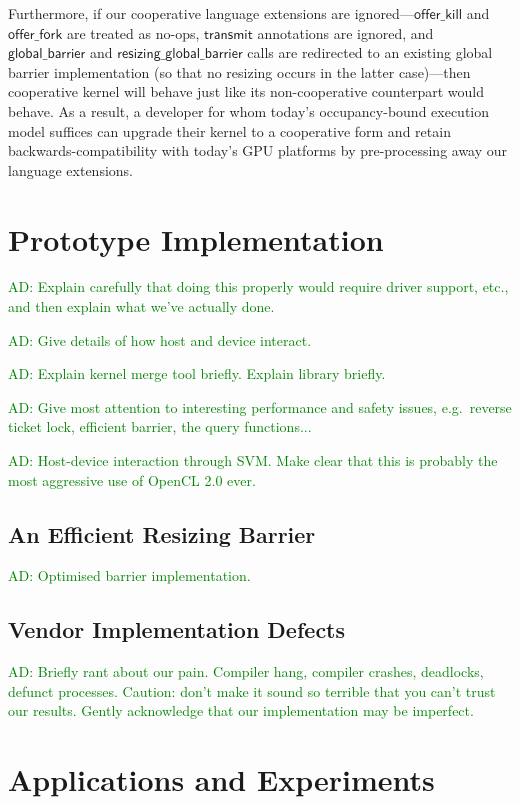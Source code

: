 \documentclass[numbers,nocopyrightspace,10pt]{sigplanconf}
\newcommand{\ADComment}[1]{\textcolor{green}{AD: #1}}
\newcommand{\transmit}{\mathsf{transmit}}
\newcommand{\offerfork}{\mathsf{offer\_fork}}
\newcommand{\offerkill}{\mathsf{offer\_kill}}
\newcommand{\globalbarrier}{\mathsf{global\_barrier}}
\newcommand{\resizingglobalbarrier}{\mathsf{resizing\_global\_barrier}}
\begin{document}
Furthermore, if our cooperative language extensions are
ignored---$\offerkill$ and $\offerfork$ are treated as no-ops,
$\transmit$ annotations are ignored, and $\globalbarrier$ and
$\resizingglobalbarrier$ calls are redirected to an existing global
barrier implementation (so that no resizing occurs in the latter
case)---then cooperative kernel will behave just like its
non-cooperative counterpart would behave.  As a result, a developer
for whom today's occupancy-bound execution model suffices can upgrade
their kernel to a cooperative form and retain backwards-compatibility
with today's GPU platforms by pre-processing away our language
extensions.


\section{Prototype Implementation}\label{sec:implementation}

\ADComment{Explain carefully that doing this properly would require
  driver support, etc., and then explain what we've actually done.}

\ADComment{Give details of how host and device interact.}

\ADComment{Explain kernel merge tool briefly.  Explain library briefly.}

\ADComment{Give most attention to interesting performance and safety issues, e.g.\ reverse ticket lock, efficient barrier, the query functions...}

\ADComment{Host-device interaction through SVM.  Make clear that this is probably the most aggressive use of OpenCL 2.0 ever.}

\subsection{An Efficient Resizing Barrier}\label{sec:resizingbarrier}

\ADComment{Optimised barrier implementation.}

\subsection{Vendor Implementation Defects}

\ADComment{Briefly rant about our pain.  Compiler hang, compiler crashes, deadlocks, defunct processes.  Caution: don't make it sound so terrible that you can't trust our results.  Gently acknowledge that our implementation may be imperfect.}


\section{Applications and Experiments}\label{sec:experiments}
\end{document}
